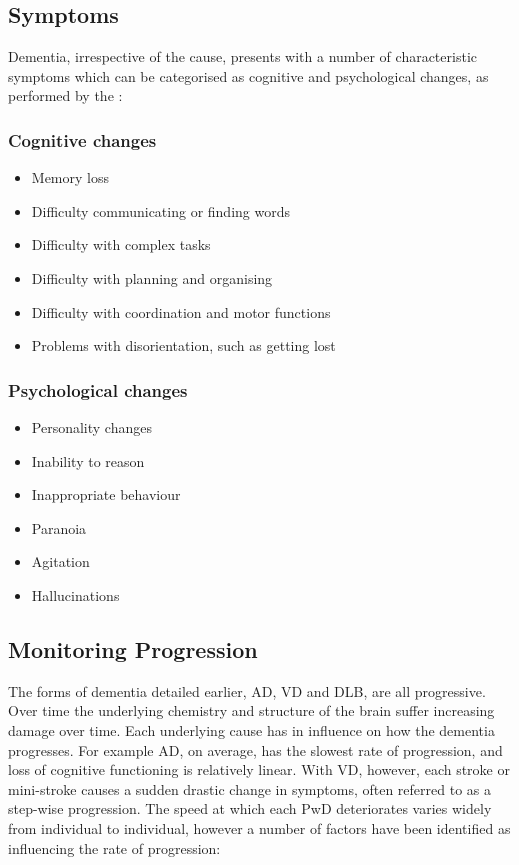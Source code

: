 \subsection{Symptoms}
Dementia, irrespective of the cause, presents with a number of characteristic symptoms \cite{NationalHealthService2015} which  can be categorised as cognitive and psychological changes, as performed by the \citeauthor{MayoFoundationforMedicalEducationandResearch2015} \cite{MayoFoundationforMedicalEducationandResearch2015}:

\subsubsection{Cognitive changes}
\begin{itemize}[noitemsep,topsep=0pt]
\item Memory loss
\item Difficulty communicating or finding words
\item Difficulty with complex tasks
\item Difficulty with planning and organising
\item Difficulty with coordination and motor functions
\item Problems with disorientation, such as getting lost
\end{itemize}

\subsubsection{Psychological changes}

\begin{itemize}[noitemsep,topsep=0pt]
\item Personality changes
\item Inability to reason
\item Inappropriate behaviour
\item Paranoia
\item Agitation
\item Hallucinations
\end{itemize}

\subsection{Monitoring Progression}
The forms of dementia detailed earlier, AD, VD and DLB, are all progressive. Over time the underlying chemistry and structure of the brain suffer increasing damage over time. Each underlying cause has in influence on how the dementia progresses. For example AD, on average, has the slowest rate of progression, and loss of cognitive functioning is relatively linear. With VD, however, each stroke or mini-stroke causes a sudden drastic change in symptoms, often referred to as a step-wise progression.
The speed at which each PwD deteriorates varies widely from individual to individual, however a number of factors have been identified as influencing the rate of progression:


